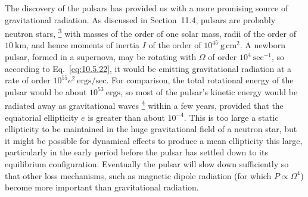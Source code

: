 The discovery of the pulsars has provided us with a more promising source of
gravitational radiation. As discussed in Section~11.4, pulsars are probably
neutron stars,%
\hyperref[ch10-ref-3]{\textsuperscript{3}}
with masses of the order of one solar mass, radii of the order of
\(10\ \mathrm{km}\), and hence moments of inertia \(I\) of the order of
\(10^{45}\ \mathrm{g\,cm^2}\). A newborn pulsar, formed in a supernova, may
be rotating with \(\Omega\) of order \(10^4\ \mathrm{sec}^{-1}\), so
according to Eq.~\eqref{eq:10.5.22}, it would be emitting gravitational
radiation at a rate of order \(10^{55}e^2\ \mathrm{ergs/sec}\). For
comparison, the total rotational energy of the pulsar would be about
\(10^{53}\ \mathrm{ergs}\), so most of the pulsar's kinetic energy would be
radiated away as gravitational waves%
\hyperref[ch10-ref-4]{\textsuperscript{4}}
within a few years, provided that the equatorial ellipticity \(e\) is greater
than about \(10^{-4}\). This is too large a static ellipticity to be
maintained in the huge gravitational field of a neutron star, but it might be
possible for dynamical effects to produce a mean ellipticity this large,
particularly in the early period before the pulsar has settled down to its
equilibrium configuration. Eventually the pulsar will slow down sufficiently
so that other loss mechanisms, such as magnetic dipole radiation (for which
\(P\propto\Omega^4\)) become more important than gravitational radiation.
